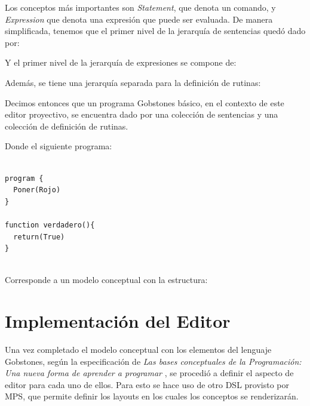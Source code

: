 Los conceptos más importantes son \textit{Statement}, que denota un comando, y \textit{Expression} que denota una expresión que puede ser evaluada. De manera simplificada, tenemos que el primer nivel de la jerarquía de sentencias quedó dado por:

\centertree{
  [Statement 
      [Alternative ]
      [Loop]
      [Procedure]
      [Assignment]
  ]
}

\bigskip

Y el primer nivel de la jerarquía de expresiones se compone de:

\centertree{
  [Expression 
      [BinaryOperation]
      [Value]
      [FunctionCall]
  ]
}

\bigskip

Además, se tiene una jerarquía separada para la definición de rutinas:

\centertree{
  [RoutineDeclaration 
    [ProcedureDeclaration] 
    [FunctionDeclaration]
  ]
}


Decimos entonces que un programa Gobstones básico, en el contexto de este editor proyectivo, se encuentra dado por una colección de sentencias y una colección de definición de rutinas.

Donde el siguiente programa:

\begin{lstlisting}[frame=single] 

program {
  Poner(Rojo)
}

function verdadero(){
  return(True)
}
    
\end{lstlisting}

Corresponde a un modelo conceptual con la estructura:



\section{Implementación del Editor}\label{editor}

Una vez completado el modelo conceptual con los elementos del lenguaje Gobstones, según la especificación de \textit{Las bases conceptuales de la Programación: Una nueva forma de aprender a programar} \cite{Gobstones}, se procedió a definir el aspecto de editor para cada uno de ellos. Para esto se hace uso de otro DSL provisto por MPS, que permite definir los layouts en los cuales los conceptos se renderizarán.

